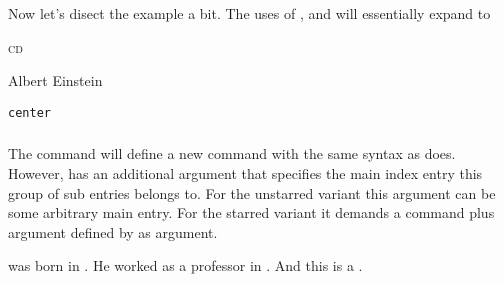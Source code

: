 \documentclass[load-preamble,add-index,scrartcl={DIV10}]{cnltx-doc}
\begin{document}
Now let's disect the example a bit.  The uses of ,
\sarg{} and  will
essentially expand to
\begin{sourcecode}
  \textsc{cd}
 
  \textsf{Albert Einstein}
 
  \texttt{center}
\end{sourcecode}

\subsubsection{}\label{sec:command:usage:newsubidxcmd}
The command \sarg{} will define a new command  with the same syntax as
 does.  However,  has an additional argument
that specifies the main index entry this group of sub entries belongs to.  For
the unstarred variant this argument can be some arbitrary main entry.  For the
starred variant it demands a command plus argument defined by 
as argument.

\begin{example}
   was born in
  . He worked as a
  professor in . And this is a
  .
\end{example}
\end{document}
